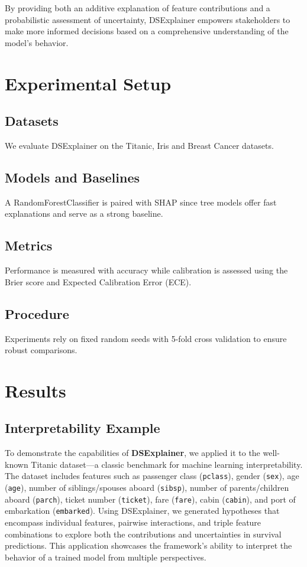 \documentclass[acmlarge]{acmart}
\begin{document}
By providing both an additive explanation of feature contributions and a probabilistic assessment of uncertainty, DSExplainer empowers stakeholders to make more informed decisions based on a comprehensive understanding of the model’s behavior.
\section{Experimental Setup}

\subsection{Datasets}
We evaluate DSExplainer on the Titanic, Iris and Breast Cancer datasets.
\subsection{Models and Baselines}
A RandomForestClassifier is paired with SHAP since tree models offer fast explanations and serve as a strong baseline.
\subsection{Metrics}
Performance is measured with accuracy while calibration is assessed using the Brier score and Expected Calibration Error (ECE).
\subsection{Procedure}
Experiments rely on fixed random seeds with 5-fold cross validation to ensure robust comparisons.

\section{Results}
\label{sec:results}
\subsection{Interpretability Example}
\label{sec:interpretability_example}

To demonstrate the capabilities of \textbf{DSExplainer}, we applied it to the well-known Titanic dataset—a classic benchmark for machine learning interpretability. The dataset includes features such as passenger class (\texttt{pclass}), gender (\texttt{sex}), age (\texttt{age}), number of siblings/spouses aboard (\texttt{sibsp}), number of parents/children aboard (\texttt{parch}), ticket number (\texttt{ticket}), fare (\texttt{fare}), cabin (\texttt{cabin}), and port of embarkation (\texttt{embarked}). Using DSExplainer, we generated hypotheses that encompass individual features, pairwise interactions, and triple feature combinations to explore both the contributions and uncertainties in survival predictions. This application showcases the framework's ability to interpret the behavior of a trained model from multiple perspectives.
\end{document}
